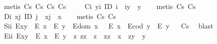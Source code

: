 \begin{isabellebody}
\endisadelimproof
%
\isatagproof
{}\isamarkupfalse%
\ {\isacharparenleft}metis\ Cs\ Cs\ Cs\ Cs{\isacharparenright}%
\endisatagproof
{\isafoldproof}%
%
\isadelimproof
%
\endisadelimproof
\isanewline
\ \ \ \isamarkupfalse%
\ C\isactrlsub i{\isacharcolon}\ {\isachardoublequoteopen}\isactrlbold {\isasymforall}y{\isachardot}\isactrlbold {\isasymexists}i{\isachardot}\ ID\ i\ \isactrlbold {\isasymand}\ i{\isasymcdot}y\ {\isasymcong}\ y{\isachardoublequoteclose}%
\isadelimproof
\ \ %
\endisadelimproof
%
\isatagproof
{}\isamarkupfalse%
\ {\isacharparenleft}metis\ Cs\ Cs{\isacharparenright}%
\endisatagproof
{\isafoldproof}%
%
\isadelimproof
%
\endisadelimproof
\isanewline
\ \ \ \isamarkupfalse%
\ D\isactrlsub i{\isacharcolon}\ {\isachardoublequoteopen}\isactrlbold {\isasymforall}x{\isachardot}\isactrlbold {\isasymexists}j{\isachardot}\ ID\ j\ \isactrlbold {\isasymand}\ x{\isasymcdot}j\ {\isasymcong}\ x{\isachardoublequoteclose}%
\isadelimproof
\ \ %
\endisadelimproof
%
\isatagproof
{}\isamarkupfalse%
\ {\isacharparenleft}metis\ Cs\ Cs{\isacharparenright}%
\endisatagproof
{\isafoldproof}%
%
\isadelimproof
%
\endisadelimproof
\isanewline
\isanewline
\ \ \ \isamarkupfalse%
\ S\isactrlsub i\isactrlsub i{\isacharcolon}\ {\isachardoublequoteopen}{\isacharparenleft}E{\isacharparenleft}x{\isasymcdot}y{\isacharparenright}\ \isactrlbold {\isasymrightarrow}\ {\isacharparenleft}E\ x\ \isactrlbold {\isasymand}\ E\ y{\isacharparenright}{\isacharparenright}\ \isactrlbold {\isasymand}\ {\isacharparenleft}E{\isacharparenleft}dom\ x\ {\isacharparenright}\ \isactrlbold {\isasymrightarrow}\ E\ x{\isacharparenright}\ \isactrlbold {\isasymand}\ {\isacharparenleft}E{\isacharparenleft}cod\ y{\isacharparenright}\ \isactrlbold {\isasymrightarrow}\ E\ y{\isacharparenright}{\isachardoublequoteclose}%
\isadelimproof
\ %
\endisadelimproof
%
\isatagproof
{}\isamarkupfalse%
\ Cs\ \isamarkupfalse%
\ blast%
\endisatagproof
{\isafoldproof}%
%
\isadelimproof
%
\endisadelimproof
\isanewline
\ \ \ \isamarkupfalse%
\ E\isactrlsub i\isactrlsub i{\isacharcolon}\ {\isachardoublequoteopen}E{\isacharparenleft}x{\isasymcdot}y{\isacharparenright}\ \isactrlbold {\isasymleftarrow}\ {\isacharparenleft}E\ x\ \isactrlbold {\isasymand}\ E\ y\ \isactrlbold {\isasymand}\ {\isacharparenleft}\isactrlbold {\isasymexists}z{\isachardot}\ z{\isasymcdot}z\ {\isasymcong}\ z\ \isactrlbold {\isasymand}\ x{\isasymcdot}z\ {\isasymcong}\ x\ \isactrlbold {\isasymand}\ z{\isasymcdot}y\ {\isasymcong}\ y{\isacharparenright}{\isacharparenright}{\isachardoublequoteclose}%

\end{isabellebody}
